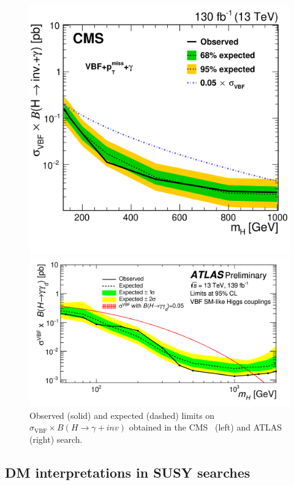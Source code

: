 \documentclass{moriond}
\begin{document}
\begin{figure} [htb]
\begin{minipage}{0.45\linewidth}
\centerline{\includegraphics[width=0.9\linewidth]{cmsvbf}}
\end{minipage}
\begin{minipage}{0.45\linewidth}
\centerline{\includegraphics[width=0.9\linewidth]{atlasvbf}}
\end{minipage}
\caption[]{Observed (solid) and expected (dashed) limits on $\sigma_{\mathrm{VBF}}\times B(H\rightarrow\gamma+inv)$ obtained in the CMS~\cite{cmsvbf} (left) and ATLAS~\cite{atlasvbf} (right) search.}
\label{fig:vbf}
\end{figure}

\subsection{DM interpretations in SUSY searches}
\end{document}
